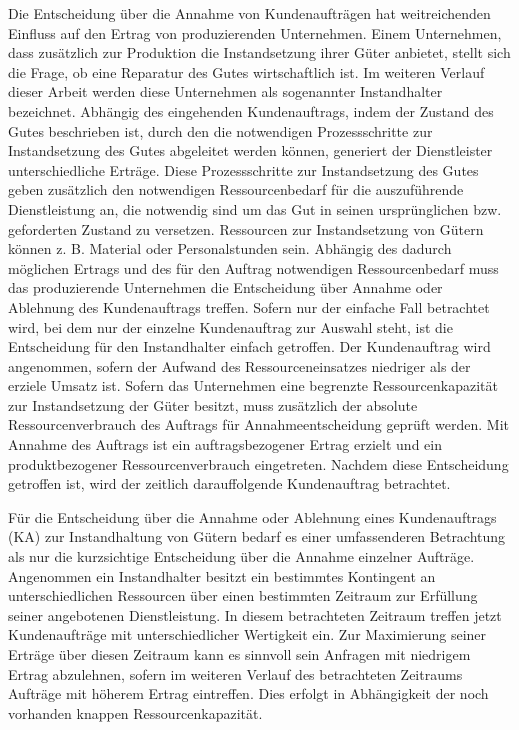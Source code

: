 Die Entscheidung über die Annahme von Kundenaufträgen hat weitreichenden Einfluss auf den Ertrag von produzierenden Unternehmen. Einem Unternehmen, dass zusätzlich zur Produktion die Instandsetzung ihrer Güter anbietet, stellt sich die Frage, ob eine Reparatur des Gutes wirtschaftlich ist. Im weiteren Verlauf dieser Arbeit werden diese Unternehmen als sogenannter Instandhalter bezeichnet. Abhängig des eingehenden Kundenauftrags, indem der Zustand des Gutes beschrieben ist, durch den die notwendigen Prozessschritte zur Instandsetzung des Gutes abgeleitet werden können, generiert der Dienstleister unterschiedliche Erträge. Diese Prozessschritte zur Instandsetzung des Gutes geben zusätzlich den notwendigen Ressourcenbedarf für die auszuführende Dienstleistung an, die notwendig sind um das Gut in seinen ursprünglichen bzw. geforderten Zustand zu versetzen. Ressourcen zur Instandsetzung von Gütern können z. B. Material oder Personalstunden sein. Abhängig des dadurch möglichen Ertrags und des für den Auftrag notwendigen Ressourcenbedarf muss das produzierende Unternehmen die Entscheidung über Annahme oder Ablehnung des Kundenauftrags treffen. Sofern nur der einfache Fall betrachtet wird, bei dem nur der einzelne Kundenauftrag zur Auswahl steht, ist die Entscheidung für den Instandhalter einfach getroffen. Der Kundenauftrag wird angenommen, sofern der Aufwand des Ressourceneinsatzes niedriger als der erziele Umsatz ist.
Sofern das Unternehmen eine begrenzte Ressourcenkapazität zur Instandsetzung der Güter besitzt, muss zusätzlich der absolute Ressourcenverbrauch des Auftrags für Annahmeentscheidung geprüft werden. Mit Annahme des Auftrags ist ein auftragsbezogener Ertrag erzielt und ein produktbezogener Ressourcenverbrauch eingetreten. Nachdem diese Entscheidung getroffen ist, wird der zeitlich darauffolgende Kundenauftrag betrachtet.

Für die Entscheidung über die Annahme oder Ablehnung eines Kundenauftrags (KA) zur Instandhaltung von Gütern bedarf es einer umfassenderen Betrachtung als nur die kurzsichtige Entscheidung über die Annahme einzelner Aufträge. Angenommen ein Instandhalter besitzt ein bestimmtes Kontingent an unterschiedlichen Ressourcen über einen bestimmten Zeitraum zur Erfüllung seiner angebotenen Dienstleistung. In diesem betrachteten Zeitraum treffen jetzt Kundenaufträge mit unterschiedlicher Wertigkeit ein. Zur Maximierung seiner Erträge über diesen Zeitraum kann es sinnvoll sein Anfragen mit niedrigem Ertrag abzulehnen, sofern im weiteren Verlauf des betrachteten Zeitraums Aufträge mit höherem Ertrag eintreffen. Dies erfolgt in Abhängigkeit der noch vorhanden knappen Ressourcenkapazität.

